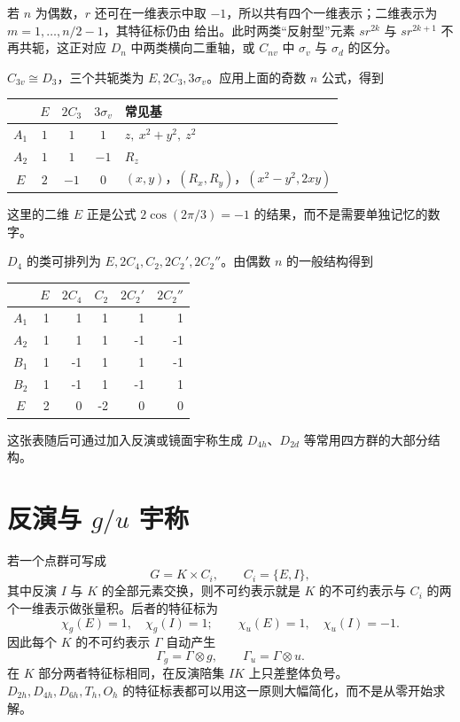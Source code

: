 若 $n$ 为偶数，$r$ 还可在一维表示中取 $-1$，所以共有四个一维表示；二维表示为 $m=1,\dots,n/2-1$，其特征标仍由  给出。此时两类“反射型”元素 $sr^{2k}$ 与 $sr^{2k+1}$ 不再共轭，这正对应 $D_n$ 中两类横向二重轴，或 $C_{nv}$ 中 $\sigma_v$ 与 $\sigma_d$ 的区分。

\begin{example}[$C_{3v}$]
$C_{3v}\cong D_3$，三个共轭类为 $E,2C_3,3\sigma_v$。应用上面的奇数 $n$ 公式，得到
\begin{center}
\begin{tabular}{c|ccc|l}
\toprule
 & $E$ & $2C_3$ & $3\sigma_v$ & 常见基 \\
\midrule
$A_1$ & $1$ & $1$ & $1$ & $z,\ x^2+y^2,\ z^2$ \\
$A_2$ & $1$ & $1$ & $-1$ & $R_z$ \\
$E$   & $2$ & $-1$ & $0$ & $(x,y)$，$(R_x,R_y)$，$(x^2-y^2,2xy)$ \\
\bottomrule
\end{tabular}
\end{center}
这里的二维 $E$ 正是公式 $2\cos(2\pi/3)=-1$ 的结果，而不是需要单独记忆的数字。
\end{example}

\begin{example}[$D_4$]
$D_4$ 的类可排列为 $E,2C_4,C_2,2C_2',2C_2''$。由偶数 $n$ 的一般结构得到
\begin{center}
\begin{tabular}{c|rrrrr}
\toprule
 & $E$ & $2C_4$ & $C_2$ & $2C_2'$ & $2C_2''$ \\
\midrule
$A_1$ & 1& 1& 1& 1& 1\\
$A_2$ & 1& 1& 1&-1&-1\\
$B_1$ & 1&-1& 1& 1&-1\\
$B_2$ & 1&-1& 1&-1& 1\\
$E$   & 2& 0&-2& 0& 0\\
\bottomrule
\end{tabular}
\end{center}
这张表随后可通过加入反演或镜面宇称生成 $D_{4h}$、$D_{2d}$ 等常用四方群的大部分结构。
\end{example}

\section{\texorpdfstring{反演与 $g/u$ 宇称}{反演与 g/u 宇称}}

若一个点群可写成
\[
G=K\times C_i,
\qquad C_i=\{E,I\},
\]
其中反演 $I$ 与 $K$ 的全部元素交换，则不可约表示就是 $K$ 的不可约表示与 $C_i$ 的两个一维表示做张量积。后者的特征标为
\[
\chi_g(E)=1,\quad \chi_g(I)=1;
\qquad
\chi_u(E)=1,\quad \chi_u(I)=-1.
\]
因此每个 $K$ 的不可约表示 $\Gamma$ 自动产生
\[
\Gamma_g=\Gamma\otimes g,
\qquad
\Gamma_u=\Gamma\otimes u.
\]
在 $K$ 部分两者特征标相同，在反演陪集 $IK$ 上只差整体负号。$D_{2h},D_{4h},D_{6h},T_h,O_h$ 的特征标表都可以用这一原则大幅简化，而不是从零开始求解。

